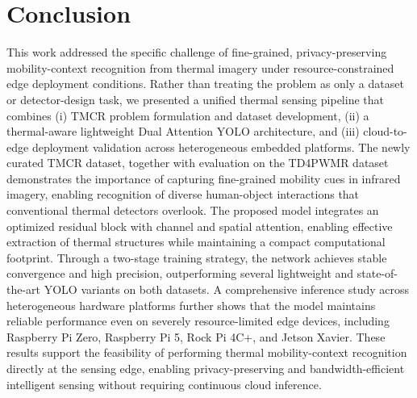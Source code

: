 \documentclass[journal,twoside,web]{ieeecolor}
\begin{document}
\section{Conclusion}
This work addressed the specific challenge of fine-grained, privacy-preserving mobility-context recognition from thermal imagery under resource-constrained edge deployment conditions. Rather than treating the problem as only a dataset or detector-design task, we presented a unified thermal sensing pipeline that combines (i) TMCR problem formulation and dataset development, (ii) a thermal-aware lightweight Dual Attention YOLO architecture, and (iii) cloud-to-edge deployment validation across heterogeneous embedded platforms. The newly curated TMCR dataset, together with evaluation on the TD4PWMR dataset demonstrates the importance of capturing fine-grained mobility cues in infrared imagery, enabling recognition of diverse human-object interactions that conventional thermal detectors overlook. The proposed model integrates an optimized residual block with channel and spatial attention, enabling effective extraction of thermal structures while maintaining a compact computational footprint. Through a two-stage training strategy, the network achieves stable convergence and high precision, outperforming several lightweight and state-of-the-art YOLO variants on both datasets. A comprehensive inference study across heterogeneous hardware platforms further shows that the model maintains reliable performance even on severely resource-limited edge devices, including Raspberry Pi Zero, Raspberry Pi 5, Rock Pi 4C+, and Jetson Xavier. These results support the feasibility of performing thermal mobility-context recognition directly at the sensing edge, enabling privacy-preserving and bandwidth-efficient intelligent sensing without requiring continuous cloud inference.



  

\end{document}
